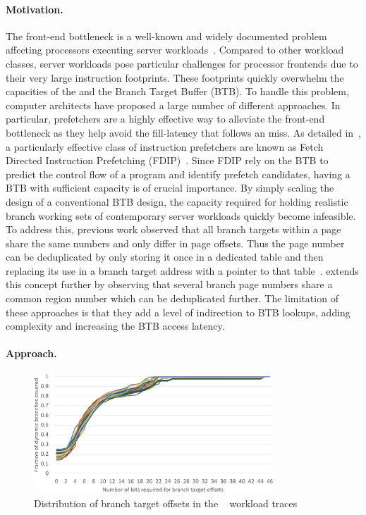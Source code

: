 \documentclass[../main.tex]{subfiles}
\begin{document}
\begin{refsection}
\paragraph{Motivation.}
The front-end bottleneck is a well-known and widely documented problem
affecting processors executing server
workloads~\cite{ailamaki99_dbmss_moder_proces,ferdman12_clear_cloud,kanev15_profil,ayers19_asmdb}. Compared
to other workload classes, server workloads pose particular challenges
for processor frontends due to their very large instruction
footprints. These footprints quickly overwhelm the capacities of the
 and the Branch Target Buffer (BTB). To handle
this problem, computer architects have proposed a large number of
different approaches. In particular,  prefetchers
are a highly effective way to alleviate the front-end bottleneck as
they help avoid the fill-latency that follows an 
miss.  As detailed in~, a particularly
effective class of instruction prefetchers are known as Fetch Directed
Instruction Prefetching
(FDIP)~\cite{reinman99_fetch_direc_instr_prefet}. Since FDIP rely on
the BTB to predict the control flow of a program and identify prefetch
candidates, having a BTB with sufficient capacity is of crucial
importance. By simply scaling the design of a conventional BTB design,
the capacity required for holding realistic branch working sets of
contemporary server workloads quickly become infeasible. To address
this, previous work observed that all branch targets within a page
share the same numbers and only differ in page offsets. Thus the page
number can be deduplicated by only storing it once in a dedicated
table and then replacing its use in a branch target address with a
pointer to that
table~\cite{seznec96_dont_use_page_number_point_it}. \textcite{soundararajan21_pdede}
extends this concept further by observing that several branch page
numbers share a common region number which can be deduplicated
further. The limitation of these approaches is that they add a level
of indirection to BTB lookups, adding complexity and increasing the
BTB access latency.


\paragraph{Approach.}

\begin{figure}[ht]
  \centering
  \includegraphics[width=0.8\textwidth]{figures/offset_distribution.pdf}
  \caption{\label{fig:offset-distr} Distribution of branch target offsets in the ~\cite{ipc1} workload traces}
\end{figure}


\end{refsection}
\end{document}
